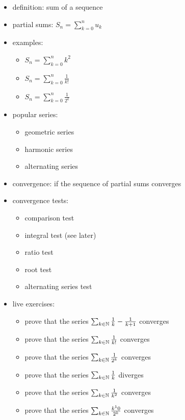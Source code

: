 \begin{itemize}
\tightlist
\item
  definition: sum of a sequence
\item
  partial sums: \(S_n = \sum_{k=0}^n u_k\)
\item
  examples:

  \begin{itemize}
  \tightlist
  \item
    \(S_n = \sum_{k=0}^n k^2\)
  \item
    \(S_n = \sum_{k=0}^n \frac{1}{k!}\)
  \item
    \(S_n = \sum_{k=0}^n \frac{1}{2^k}\)
  \end{itemize}
\item
  popular series:

  \begin{itemize}
  \tightlist
  \item
    geometric series
  \item
    harmonic series
  \item
    alternating series
  \end{itemize}
\item
  convergence: if the sequence of partial sums converges
\item
  convergence tests:

  \begin{itemize}
  \tightlist
  \item
    comparison test
  \item
    integral test (see later)
  \item
    ratio test
  \item
    root test
  \item
    alternating series test
  \end{itemize}
\item
  live exercises:

  \begin{itemize}
  \tightlist
  \item
    prove that the series \(\sum_{k \in \mathbb{N}} \frac{1}{k}-\frac{1}{k+1}\)
    converges
  \item
    prove that the series \(\sum_{k \in \mathbb{N}} \frac{1}{k!}\) converges
  \item
    prove that the series \(\sum_{k \in \mathbb{N}} \frac{1}{2^k}\) converges
  \item
    prove that the series \(\sum_{k \in \mathbb{N}} \frac{1}{k}\) diverges
  \item
    prove that the series \(\sum_{k \in \mathbb{N}} \frac{1}{k^2}\) converges
  \item
    prove that the series \(\sum_{k \in \mathbb{N}} \frac{k^10}{2^k}\) converges
  \end{itemize}
\end{itemize}

